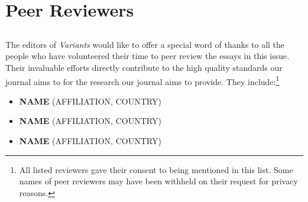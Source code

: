 \pagestyle{authors}
\chapter*{Peer Reviewers}
\protect\thispagestyle{chaptertitlepage}


\section*{}
The editors of \emph{Variants} would like to offer a special word of thanks to all the people who have volunteered their time to peer review the essays in this issue. Their invaluable efforts directly contribute to the high quality standards our journal aims to for the research  our journal aims to provide. They include:\footnote{All listed reviewers gave their consent to being mentioned in this list. Some names of peer reviewers may have been withheld on their request for privacy reasons.} 

\begin{itemize}
    \item \textbf{NAME} (AFFILIATION, COUNTRY)
    \item \textbf{NAME} (AFFILIATION, COUNTRY)
    \item \textbf{NAME} (AFFILIATION, COUNTRY)
\end{itemize}

